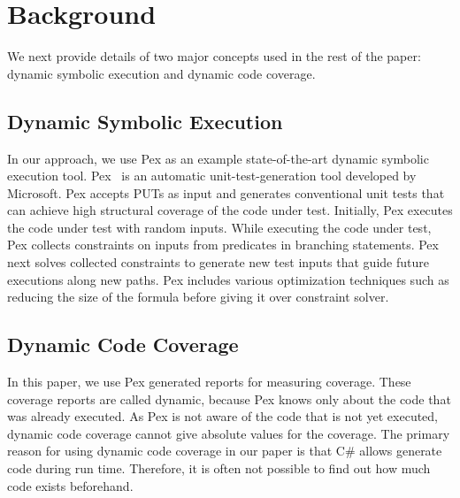 \section{Background}
\label{sec:background}

We next provide details of two major concepts used in the rest of
the paper: dynamic symbolic execution and dynamic code coverage.

\subsection{Dynamic Symbolic Execution}

In our approach, we use Pex as an example state-of-the-art dynamic symbolic 
execution tool. Pex~\cite{tillman:pexwhite} is an automatic unit-test-generation 
tool developed by Microsoft. Pex accepts PUTs as input and generates conventional 
unit tests that can achieve high 
structural coverage of the code under test. Initially, Pex
executes the code under test with random inputs. While executing
the code under test, Pex collects constraints on inputs from predicates
in branching statements. Pex next solves collected constraints
to generate new test inputs that guide future executions along
new paths. Pex includes various optimization techniques such as
reducing the size of the formula before giving it over constraint solver.

\subsection{Dynamic Code Coverage}

In this paper, we use Pex generated reports for measuring coverage. These coverage
reports are called dynamic, because Pex knows only about the code that was already executed.
As Pex is not aware of the code that is not yet executed, dynamic code coverage
cannot give absolute values for the coverage. The primary reason for using
dynamic code coverage in our paper is that C\# allows generate code during run time.
Therefore, it is often not possible to find out how much code exists beforehand.